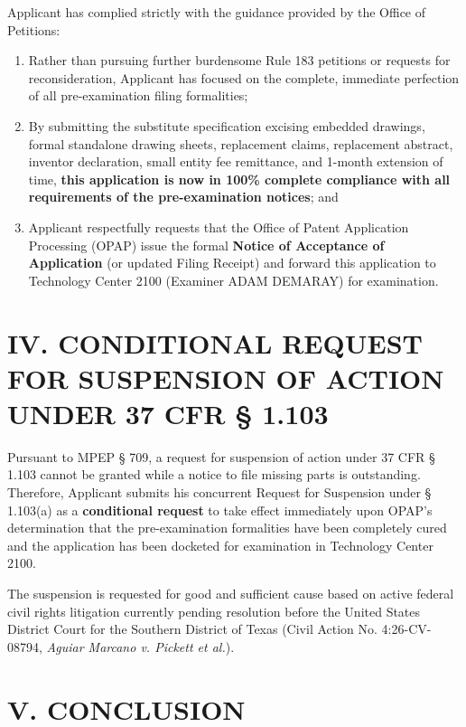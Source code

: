 \documentclass[11pt,letterpaper]{article}
\begin{document}
Applicant has complied strictly with the guidance provided by the Office of Petitions:
\begin{enumerate}[leftmargin=2em, itemsep=2pt, parsep=0pt]
    \item Rather than pursuing further burdensome Rule 183 petitions or requests for reconsideration, Applicant has focused on the complete, immediate perfection of all pre-examination filing formalities;
    \item By submitting the substitute specification excising embedded drawings, formal standalone drawing sheets, replacement claims, replacement abstract, inventor declaration, small entity fee remittance, and 1-month extension of time, \textbf{this application is now in 100\% complete compliance with all requirements of the pre-examination notices}; and
    \item Applicant respectfully requests that the Office of Patent Application Processing (OPAP) issue the formal \textbf{Notice of Acceptance of Application} (or updated Filing Receipt) and forward this application to Technology Center 2100 (Examiner ADAM DEMARAY) for examination.
\end{enumerate}

\section*{IV. CONDITIONAL REQUEST FOR SUSPENSION OF ACTION UNDER 37 CFR \S{} 1.103}

Pursuant to MPEP \S{} 709, a request for suspension of action under 37 CFR \S{} 1.103 cannot be granted while a notice to file missing parts is outstanding. Therefore, Applicant submits his concurrent Request for Suspension under \S{} 1.103(a) as a \textbf{conditional request} to take effect immediately upon OPAP's determination that the pre-examination formalities have been completely cured and the application has been docketed for examination in Technology Center 2100.

The suspension is requested for good and sufficient cause based on active federal civil rights litigation currently pending resolution before the United States District Court for the Southern District of Texas (Civil Action No. 4:26-CV-08794, \textit{Aguiar Marcano v. Pickett et al.}).

\section*{V. CONCLUSION}
\end{document}
